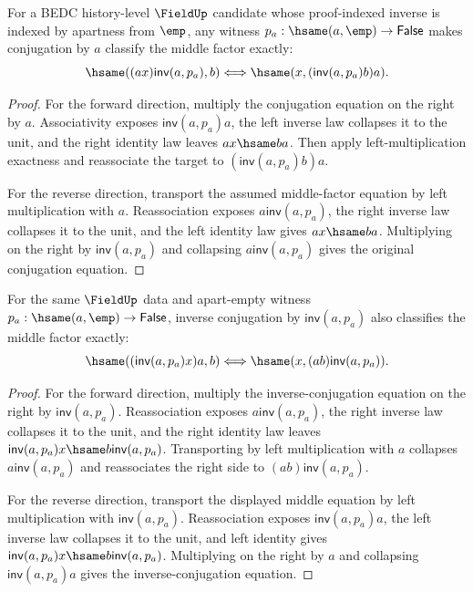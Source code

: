 \begin{theorem}
\label{thm:field-apart-empty-conjugation-equation-exact}
For a BEDC history-level $\FieldUp$ candidate whose proof-indexed inverse is
indexed by apartness from $\emp$, any witness
$p_a:\hsame(a,\emp)\to\mathsf{False}$ makes conjugation by $a$ classify the
middle factor exactly:
$$
\hsame((a x)\mathsf{inv}(a,p_a),b)
\Longleftrightarrow
\hsame(x,(\mathsf{inv}(a,p_a)b)a).
$$
\end{theorem}
\begin{proof}
For the forward direction, multiply the conjugation equation on the right by
$a$. Associativity exposes $\mathsf{inv}(a,p_a)a$, the left inverse law
collapses it to the unit, and the right identity law leaves $a x\hsame b a$.
Then apply left-multiplication exactness and reassociate the target to
$(\mathsf{inv}(a,p_a)b)a$.

For the reverse direction, transport the assumed middle-factor equation by
left multiplication with $a$. Reassociation exposes
$a\mathsf{inv}(a,p_a)$, the right inverse law collapses it to the unit, and
the left identity law gives $a x\hsame b a$. Multiplying on the right by
$\mathsf{inv}(a,p_a)$ and collapsing
$a\mathsf{inv}(a,p_a)$ gives the original conjugation equation.
\end{proof}

\begin{theorem}
\label{thm:field-apart-empty-inverse-conjugation-equation-exact}
For the same $\FieldUp$ data and apart-empty witness
$p_a:\hsame(a,\emp)\to\mathsf{False}$, inverse conjugation by
$\mathsf{inv}(a,p_a)$ also classifies the middle factor exactly:
$$
\hsame((\mathsf{inv}(a,p_a)x)a,b)
\Longleftrightarrow
\hsame(x,(a b)\mathsf{inv}(a,p_a)).
$$
\end{theorem}
\begin{proof}
For the forward direction, multiply the inverse-conjugation equation on the
right by $\mathsf{inv}(a,p_a)$. Reassociation exposes
$a\mathsf{inv}(a,p_a)$, the right inverse law collapses it to the unit, and
the right identity law leaves
$\mathsf{inv}(a,p_a)x\hsame b\mathsf{inv}(a,p_a)$. Transporting by left
multiplication with $a$ collapses $a\mathsf{inv}(a,p_a)$ and reassociates the
right side to $(a b)\mathsf{inv}(a,p_a)$.

For the reverse direction, transport the displayed middle equation by left
multiplication with $\mathsf{inv}(a,p_a)$. Reassociation exposes
$\mathsf{inv}(a,p_a)a$, the left inverse law collapses it to the unit, and
left identity gives
$\mathsf{inv}(a,p_a)x\hsame b\mathsf{inv}(a,p_a)$. Multiplying on the right by
$a$ and collapsing $\mathsf{inv}(a,p_a)a$ gives the inverse-conjugation
equation.
\end{proof}


